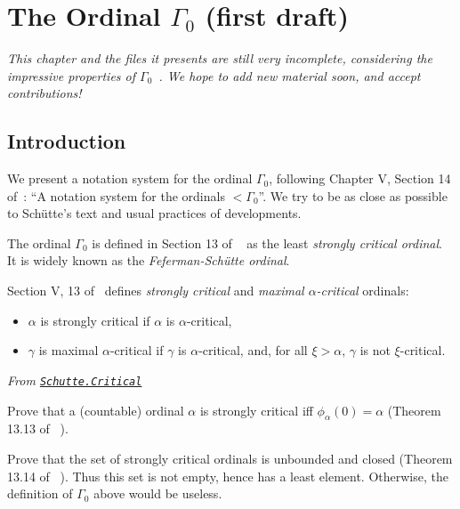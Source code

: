 {\chapter{The Ordinal \texorpdfstring{$\Gamma_0$}{Gamma0} (first draft)}


\emph{This chapter and the files it presents are still very incomplete, considering the impressive properties of $\Gamma_0$~\cite{Gallier91}.  We hope to add new material soon, and accept contributions!}


\section{Introduction}
We present a notation system for the ordinal $\Gamma_0$, following Chapter V, Section 14 of~\cite{schutte}: ``A notation system for the ordinals $<\Gamma_0$''.
We try to be as close as possible to Schütte's text and usual practices of \coq{} developments.

The ordinal $\Gamma_0$ is defined in Section 13 of ~\cite{schutte} as the least \emph{strongly critical ordinal}. It is widely known as the \emph{Feferman-Schütte ordinal}.


Section V, 13 of~\cite{schutte} defines \emph{strongly critical} and
\emph{maximal $\alpha$-critical} ordinals: 

\begin{itemize}
\item $\alpha$ is strongly critical if
$\alpha$ is $\alpha$-critical,
\item $\gamma$ is maximal $\alpha$-critical if $\gamma$ is $\alpha$-critical, and, for all $\xi>\alpha$, $\gamma$ is not $\xi$-critical.

\end{itemize}





\vspace{4pt}

\noindent\emph{From \href{../theories/html/hydras.Schutte.Critical.html\#strongly_critical}%
{\texttt{Schutte.Critical}}}




\begin{project}
Prove that a (countable)  ordinal $\alpha$ is strongly critical iff 
$\phi_\alpha(0)=\alpha$ (Theorem 13.13 of~\cite{schutte} ). 
\end{project}


\begin{project}
Prove that the set of strongly critical ordinals is unbounded and closed (Theorem 13.14 of~\cite{schutte} ). Thus this set is not empty,  hence has a least element. Otherwise, the definition of $\Gamma_0$ above would be useless.
\end{project}




}
